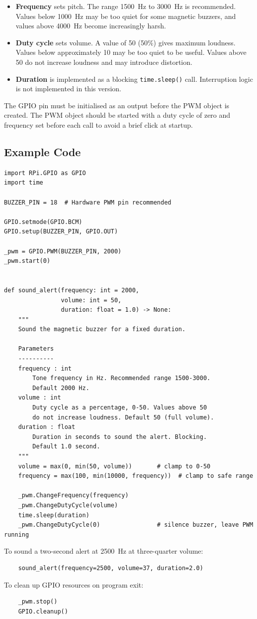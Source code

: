 \documentclass[border=10pt]{standalone}
\begin{document}
\begin{itemize}
    \item \textbf{Frequency} sets pitch. The range \SI{1500}{\hertz} to
          \SI{3000}{\hertz} is recommended. Values below \SI{1000}{\hertz} may be too
          quiet for some magnetic buzzers, and values above \SI{4000}{\hertz} become
          increasingly harsh.
    \item \textbf{Duty cycle} sets volume. A value of 50 (50\%) gives maximum loudness.
          Values below approximately 10 may be too quiet to be useful. Values above 50
          do not increase loudness and may introduce distortion.
    \item \textbf{Duration} is implemented as a blocking \texttt{time.sleep()} call.
          Interruption logic is not implemented in this version.
\end{itemize}

The GPIO pin must be initialised as an output before the PWM object is created. The
PWM object should be started with a duty cycle of zero and frequency set before each
call to avoid a brief click at startup.

\subsection{Example Code}

\begin{verbatim}
import RPi.GPIO as GPIO
import time

BUZZER_PIN = 18  # Hardware PWM pin recommended

GPIO.setmode(GPIO.BCM)
GPIO.setup(BUZZER_PIN, GPIO.OUT)

_pwm = GPIO.PWM(BUZZER_PIN, 2000)
_pwm.start(0)


def sound_alert(frequency: int = 2000,
                volume: int = 50,
                duration: float = 1.0) -> None:
    """
    Sound the magnetic buzzer for a fixed duration.

    Parameters
    ----------
    frequency : int
        Tone frequency in Hz. Recommended range 1500-3000.
        Default 2000 Hz.
    volume : int
        Duty cycle as a percentage, 0-50. Values above 50
        do not increase loudness. Default 50 (full volume).
    duration : float
        Duration in seconds to sound the alert. Blocking.
        Default 1.0 second.
    """
    volume = max(0, min(50, volume))       # clamp to 0-50
    frequency = max(100, min(10000, frequency))  # clamp to safe range

    _pwm.ChangeFrequency(frequency)
    _pwm.ChangeDutyCycle(volume)
    time.sleep(duration)
    _pwm.ChangeDutyCycle(0)                # silence buzzer, leave PWM running
\end{verbatim}

\noindent To sound a two-second alert at \SI{2500}{\hertz} at three-quarter volume:

\begin{verbatim}
    sound_alert(frequency=2500, volume=37, duration=2.0)
\end{verbatim}

\noindent To clean up GPIO resources on program exit:

\begin{verbatim}
    _pwm.stop()
    GPIO.cleanup()
\end{verbatim}
\end{document}

